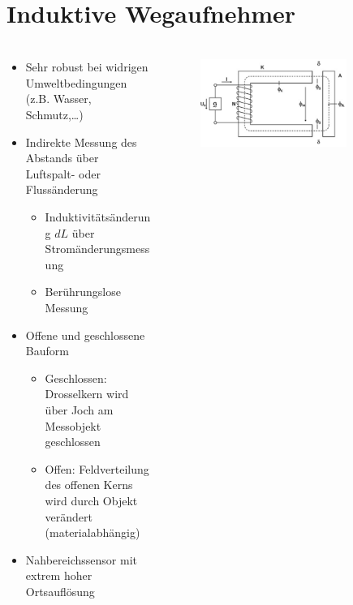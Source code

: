 \section{Induktive Wegaufnehmer}
\begin{frame}
    \frametitle{\insertsection}

    \begin{columns}[onlytextwidth]
        \begin{column}[t]{0.5\textwidth}
            \begin{itemize}
                \item Sehr robust bei widrigen Umweltbedingungen (z.B. Wasser, Schmutz,…)
                \item Indirekte Messung des Abstands über Luftspalt- oder Flussänderung
                \begin{itemize}
                    \item Induktivitätsänderung $dL$ über Stromänderungsmessung
                    \item Berührungslose Messung 
                \end{itemize}
                \item Offene und geschlossene Bauform
                \begin{itemize}
                    \item Geschlossen: Drosselkern wird über Joch am Messobjekt geschlossen
                    \item Offen: Feldverteilung des offenen Kerns wird durch Objekt verändert (materialabhängig)
                \end{itemize}
                \item Nahbereichssensor mit extrem hoher Ortsauflösung
            \end{itemize}
        \end{column}
        \begin{column}[t]{0.48\textwidth}
            \begin{figure}
                \vspace{-1cm}
                \includegraphics[width=0.8\textwidth]{fig/traenkler_2012_abb_10_3}

\end{figure}
\end{column}
\end{columns}
\end{frame}

